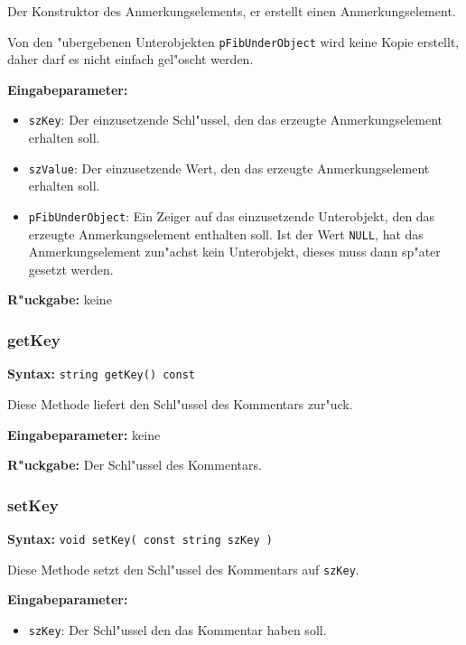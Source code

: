 \bigskip\noindent
Der Konstruktor des Anmerkungselements, er erstellt einen Anmerkungselement.

Von den "ubergebenen Unterobjekten \verb|pFibUnderObject| wird keine Kopie erstellt, daher darf es nicht einfach gel"oscht werden.

\bigskip\noindent
\textbf{Eingabeparameter:}
\begin{itemize}
 \item \verb|szKey|: Der einzusetzende Schl"ussel, den das erzeugte Anmerkungselement erhalten soll.
 \item \verb|szValue|: Der einzusetzende Wert, den das erzeugte Anmerkungselement erhalten soll.
 \item \verb|pFibUnderObject|: Ein Zeiger auf das einzusetzende Unterobjekt, den das erzeugte Anmerkungselement enthalten soll. Ist der Wert \verb|NULL|, hat das Anmerkungselement zun"achst kein Unterobjekt, dieses muss dann sp"ater gesetzt werden.
\end{itemize}

\bigskip\noindent
\textbf{R"uckgabe:} keine


\subsubsection{getKey}

\textbf{Syntax:} \verb|string getKey() const|

\bigskip\noindent
Diese Methode liefert den Schl"ussel des Kommentars zur"uck.

\bigskip\noindent
\textbf{Eingabeparameter:} keine

\bigskip\noindent
\textbf{R"uckgabe:} Der Schl"ussel des Kommentars.


\subsubsection{setKey}

\textbf{Syntax:} \verb|void setKey( const string szKey )|

\bigskip\noindent
Diese Methode setzt den Schl"ussel des Kommentars auf \verb|szKey|.

\bigskip\noindent
\textbf{Eingabeparameter:}
\begin{itemize}
 \item \verb|szKey|: Der Schl"ussel den das Kommentar haben soll.
\end{itemize}

